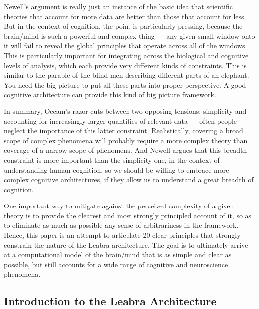 \documentclass[11pt,twoside]{article}
\begin{document}
Newell's argument is really just an instance of the basic idea that scientific
theories that account for more data are better than those that account for
less.  But in the context of cognition, the point is particularly pressing,
because the brain/mind is such a powerful and complex thing --- any given
small window onto it will fail to reveal the global principles that operate
across all of the windows.  This is particularly important for integrating
across the biological and cognitive levels of analysis, which each provide
very different kinds of constraints.  This is similar to the parable of the
blind men describing different parts of an elephant.  You need the big picture
to put all these parts into proper perspective.  A good cognitive architecture
can provide this kind of big picture framework.

In summary, Occam's razor cuts between two opposing tensions: simplicity and
accounting for increasingly larger quantities of relevant data --- often
people neglect the importance of this latter constraint.  Realistically,
covering a broad scope of complex phenomena will probably require a more
complex theory than coverage of a narrow scope of phenomena.  And Newell
argues that this breadth constraint is more important than the simplicity one,
in the context of understanding human cognition, so we should be willing to
embrace more complex cognitive architectures, if they allow us to understand a
great breadth of cognition.

One important way to mitigate against the perceived complexity of a given
theory is to provide the clearest and most strongly principled account of it,
so as to eliminate as much as possible any sense of arbitrariness in the
framework.  Hence, this paper is an attempt to articulate 20 clear principles
that strongly constrain the nature of the Leabra architecture.  The goal is to
ultimately arrive at a computational model of the brain/mind that is as simple
and clear as possible, but still accounts for a wide range of cognitive and
neuroscience phenomena.

\subsection{Introduction to the Leabra Architecture}
\end{document}
